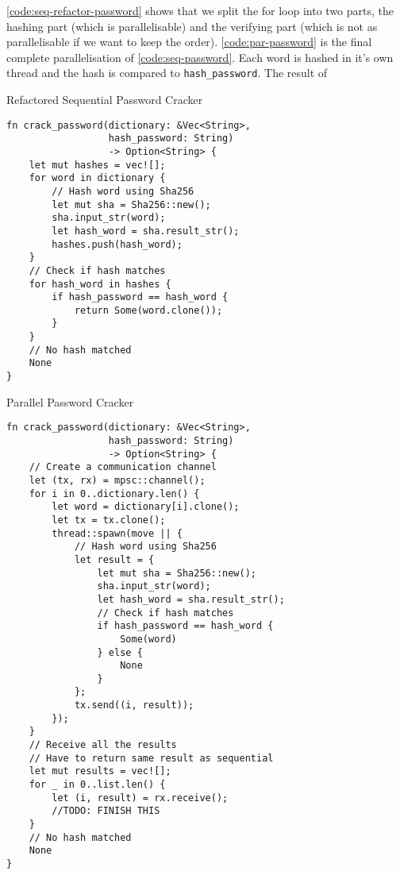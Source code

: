 \documentclass[conference]{IEEEtran}
\begin{document}
\autoref{code:seq-refactor-password} shows that we split the for loop into two parts, the hashing part (which is parallelisable) and the verifying part (which is not as parallelisable if we want to keep the order). \autoref{code:par-password} is the final complete parallelisation of \autoref{code:seq-password}. Each word is hashed in it's own thread and the hash is compared to \texttt{hash\_password}. The result of

\begin{algorithm}
\caption{Refactored Sequential Password Cracker}
\label{code:seq-refactor-password}
\begin{verbatim}
fn crack_password(dictionary: &Vec<String>,
                  hash_password: String)
                  -> Option<String> {
    let mut hashes = vec![];
    for word in dictionary {
        // Hash word using Sha256
        let mut sha = Sha256::new();
        sha.input_str(word);
        let hash_word = sha.result_str();
        hashes.push(hash_word);
    }
    // Check if hash matches
    for hash_word in hashes {
        if hash_password == hash_word {
            return Some(word.clone());
        }
    }
    // No hash matched
    None
}
\end{verbatim}
\end{algorithm}

\begin{algorithm}
\caption{Parallel Password Cracker}
\label{code:par-password}
\begin{verbatim}
fn crack_password(dictionary: &Vec<String>,
                  hash_password: String)
                  -> Option<String> {
    // Create a communication channel
    let (tx, rx) = mpsc::channel();
    for i in 0..dictionary.len() {
        let word = dictionary[i].clone();
        let tx = tx.clone();
        thread::spawn(move || {
            // Hash word using Sha256
            let result = {
                let mut sha = Sha256::new();
                sha.input_str(word);
                let hash_word = sha.result_str();
                // Check if hash matches
                if hash_password == hash_word {
                    Some(word)
                } else {
                    None
                }
            };
            tx.send((i, result));
        });
    }
    // Receive all the results
    // Have to return same result as sequential
    let mut results = vec![];
    for _ in 0..list.len() {
        let (i, result) = rx.receive();
        //TODO: FINISH THIS
    }
    // No hash matched
    None
}
\end{verbatim}
\end{algorithm}
\end{document}
